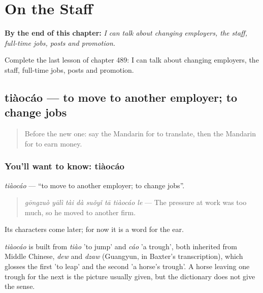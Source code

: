 
\chapter{On the Staff}
\label{ch:zh-on-the-staff}

\begin{chapteropening}
\textbf{By the end of this chapter:} \emph{I can talk about changing employers, the staff, full-time jobs, posts and promotion.}

Complete the last lesson of chapter 489: I can talk about changing employers, the staff, full-time jobs, posts and promotion.
\end{chapteropening}

\section[tiàocáo]{tiàocáo — to move to another employer; to change jobs}

\label{lesson:ZH-C489-tiaocao}



\begin{quote}
Before the new one: say the Mandarin for to translate, then the Mandarin for to earn money.
\end{quote}

\subsection*{You'll want to know: tiàocáo}
\emph{tiàocáo} — \textquotedblleft{}to move to another employer; to change jobs\textquotedblright{}.

\begin{quote}
\emph{gōngzuò yālì tài dà suǒyǐ tā tiàocáo le} — The pressure at work was too much, so he moved to another firm.
\end{quote}

Its characters come later; for now it is a word for the ear.

\begin{cousinweb}
\emph{tiàocáo} is built from \emph{tiào} 'to jump' and \emph{cáo} 'a trough', both inherited from Middle Chinese, \emph{dew} and \emph{dzaw} (Guangyun, in Baxter's transcription), which glosses the first 'to leap' and the second 'a horse's trough'. A horse leaving one trough for the next is the picture usually given, but the dictionary does not give the sense.
\end{cousinweb}

